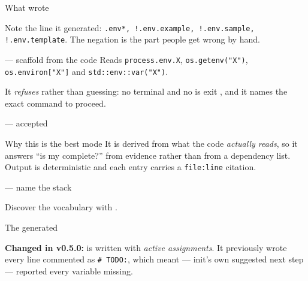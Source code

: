 \begin{frame}[fragile]{What  wrote}

  {\footnotesize Note the  line it generated:
  \texttt{.env*, !.env.example, !.env.sample, !.env.template}. The negation is
  the part people get wrong by hand.}
\end{frame}

\begin{frame}[fragile]{ — scaffold from the code}
  Reads \texttt{process.env.X}, \texttt{os.getenv("X")},
  \texttt{os.environ["X"]} and \texttt{std::env::var("X")}.


  {\footnotesize It \emph{refuses} rather than guessing: no terminal and no
   is exit \exittwo, and it names the exact command to proceed.}
\end{frame}

\begin{frame}[fragile]{ — accepted}

  \begin{block}{Why this is the best mode}
    It is derived from what the code \emph{actually reads}, so it answers
    ``is my  complete?'' from evidence rather than from a
    dependency list. Output is deterministic and each entry carries a
    \texttt{file:line} citation.
  \end{block}
\end{frame}

\begin{frame}[fragile]{ — name the stack}

  {\footnotesize Discover the vocabulary with .}
\end{frame}

\begin{frame}[fragile]{The generated }

  {\footnotesize \textbf{Changed in v0.5.0:}  is written with
  \emph{active assignments}. It previously wrote every line commented as
  \texttt{\# TODO:}, which meant  — init's own suggested next
  step — reported every variable missing.}
\end{frame}

